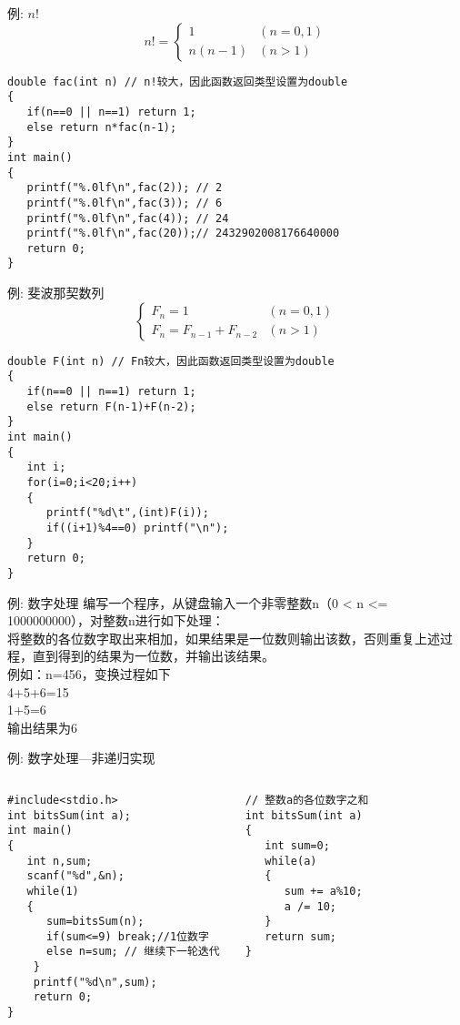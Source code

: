 \begin{frame}{例: $n!$}
\[ n!=\begin{cases}
1 &(n=0,1)\\
n(n-1) &(n>1)
\end{cases} 
\]
\pause
\begin{lstlisting}
double fac(int n) // n!较大，因此函数返回类型设置为double
{
   if(n==0 || n==1) return 1;
   else return n*fac(n-1);
}
int main()                   
{  
   printf("%.0lf\n",fac(2)); // 2
   printf("%.0lf\n",fac(3)); // 6
   printf("%.0lf\n",fac(4)); // 24
   printf("%.0lf\n",fac(20));// 2432902008176640000
   return 0;           
}           
\end{lstlisting}
\end{frame}

\begin{frame}{例: 斐波那契数列}
\[ \begin{cases}
F_n=1 &(n=0,1)\\
F_n=F_{n-1}+F_{n-2} &(n>1)
\end{cases} 
\]
\pause
\begin{lstlisting}
double F(int n) // Fn较大，因此函数返回类型设置为double
{
   if(n==0 || n==1) return 1;
   else return F(n-1)+F(n-2);
}
int main()                   
{  
   int i;
   for(i=0;i<20;i++)
   {
      printf("%d\t",(int)F(i));
      if((i+1)%4==0) printf("\n");
   } 
   return 0;           
}                            
\end{lstlisting}
\end{frame}

\begin{frame}{例: 数字处理}
编写一个程序，从键盘输入一个非零整数n（0 < n <= 1000000000），对整数n进行如下处理：\\
将整数的各位数字取出来相加，如果结果是一位数则输出该数，否则重复上述过程，直到得到的结果为一位数，并输出该结果。\\
例如：n=456，变换过程如下\\
4+5+6=15\\
1+5=6\\
输出结果为6
\end{frame}

\begin{frame}{例: 数字处理---非递归实现}
\begin{columns}[T]
\begin{lstlisting}
#include<stdio.h>
int bitsSum(int a);
int main()
{
   int n,sum;
   scanf("%d",&n);
   while(1)
   {
      sum=bitsSum(n);
      if(sum<=9) break;//1位数字
      else n=sum; // 继续下一轮迭代 
    }
    printf("%d\n",sum); 
    return 0;
}
\end{lstlisting}
\begin{lstlisting}[frame=leftline]
// 整数a的各位数字之和
int bitsSum(int a)
{
   int sum=0;
   while(a)
   {
      sum += a%10;
      a /= 10;
   }
   return sum;
}
\end{lstlisting}
\end{columns}
~\\
\end{frame}

